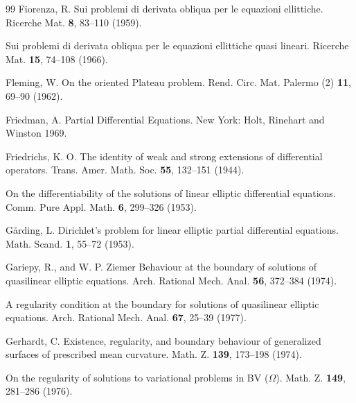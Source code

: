 \begin{thebibliography}{99}
Fiorenza, R.
Sui problemi di derivata obliqua per le equazioni ellittiche. Ricerche Mat. \textbf{8}, 83--110 (1959).

Sui problemi di derivata obliqua per le equazioni ellittiche quasi lineari. Ricerche Mat. \textbf{15},
74--108 (1966).

Fleming, W.
On the oriented Plateau problem. Rend. Circ. Mat. Palermo (2) \textbf{11}, 69--90 (1962).

Friedman, A.
Partial Differential Equations. New York: Holt, Rinehart and Winston 1969.

Friedrichs, K. O.
The identity of weak and strong extensions of differential operators. Trans. Amer. Math.
Soc. \textbf{55}, 132--151 (1944).

On the differentiability of the solutions of linear elliptic differential equations. Comm.
Pure Appl. Math. \textbf{6}, 299--326 (1953).

Gårding, L.
Dirichlet's problem for linear elliptic partial differential equations. Math. Scand. \textbf{1}, 55--72
(1953).

Gariepy, R., and W. P. Ziemer
Behaviour at the boundary of solutions of quasilinear elliptic equations. Arch. Rational
Mech. Anal. \textbf{56}, 372--384 (1974).

A regularity condition at the boundary for solutions of quasilinear elliptic equations. Arch.
Rational Mech. Anal. \textbf{67}, 25--39 (1977).

Gerhardt, C.
Existence, regularity, and boundary behaviour of generalized surfaces of prescribed mean
curvature. Math. Z. \textbf{139}, 173--198 (1974).

On the regularity of solutions to variational problems in BV ($\Omega$). Math. Z. \textbf{149}, 281--286
(1976).

\end{thebibliography}

